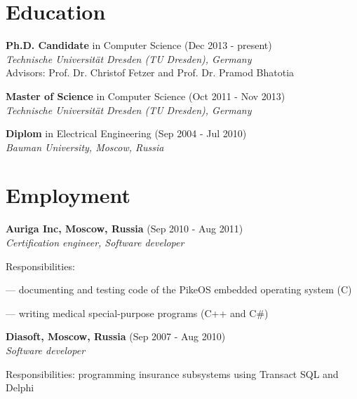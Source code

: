 \documentclass[letterpaper]{article}
\renewenvironment{itemize}{
  \begin{list}{}{
    \setlength{\leftmargin}{1.5em}
  }
}{
  \end{list}
}
\begin{document}
\section*{Education}

\begin{itemize}

 \item \textbf{Ph.D. Candidate} in Computer Science (Dec 2013 - present)\\
 {\em  Technische Universit{\"a}t Dresden (TU Dresden), Germany}\\
Advisors: Prof. Dr. Christof Fetzer and Prof. Dr. Pramod Bhatotia

 \item \textbf{Master of Science} in Computer Science (Oct 2011 - Nov 2013) \\
 {\em  Technische Universit{\"a}t Dresden (TU Dresden), Germany}


\item \textbf{Diplom} in Electrical Engineering (Sep 2004 - Jul 2010)\\
  {\em Bauman University, Moscow, Russia} 

\end{itemize}



\section*{Employment}

{\bf Auriga Inc, Moscow, Russia} (Sep 2010 - Aug 2011)\\
{\em Certification engineer, Software developer}
\begin{itemize}
	\item Responsibilities:
		\begin{itemize}
		\item --- documenting and testing code of the PikeOS embedded operating system (C)
		\item --- writing medical special-purpose programs (C++ and C\#)
		\end{itemize}
	\item 
\end{itemize}

{\bf Diasoft, Moscow, Russia} (Sep 2007 - Aug 2010)\\
{\em Software developer}
\begin{itemize}
	\item Responsibilities: programming insurance subsystems using Transact SQL and Delphi
\end{itemize}
\end{document}

